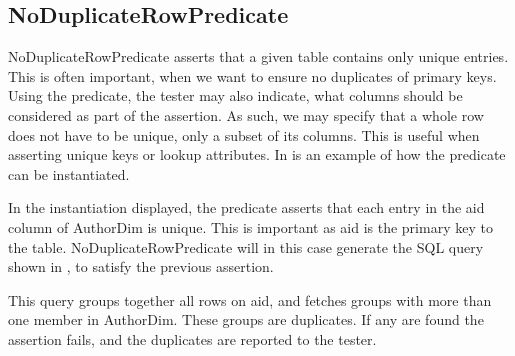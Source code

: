 \subsection{NoDuplicateRowPredicate}
NoDuplicateRowPredicate asserts that a given table contains only unique entries. This is often important, when we want to ensure no duplicates of primary keys. Using the predicate, the tester may also indicate, what columns should be considered as part of the assertion. As such, we may specify that a whole row does not have to be unique, only a subset of its columns. This is useful when asserting unique keys or lookup attributes. In  is an example of how the predicate can be instantiated.


In the instantiation displayed, the predicate asserts that each entry in the aid column of AuthorDim is unique. This is important as aid is the primary key to the table.
NoDuplicateRowPredicate will in this case generate the SQL query shown in , to satisfy the previous assertion.


This query groups together all rows on aid, and fetches groups with more than one member in AuthorDim. These groups are duplicates. If any are found the assertion fails, and the duplicates are reported to the tester.


